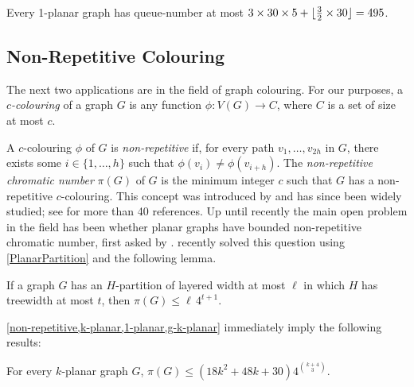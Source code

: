 \documentclass{patmorin}
\DeclarePairedDelimiter{\floor}{\lfloor}{\rfloor}
\renewcommand{\le}{\leqslant}
\begin{document}
\begin{prop}
Every 1-planar graph has queue-number at most $3 \times 30 \times 5 + \floor{\tfrac{3}{2} \times 30} = 495$. \end{prop}


\subsection{Non-Repetitive Colouring}

The next two applications are in the field of graph colouring. For our purposes, a \emph{$c$-colouring} of a graph $G$ is any function $\phi\colon V(G)\to C$, where $C$ is a set of size at most $c$.

A $c$-colouring $\phi$ of $G$ is \emph{non-repetitive} if, for every path $v_1,\ldots,v_{2h}$ in $G$, there exists some $i\in\{1,\ldots,h\}$ such that $\phi(v_i)\neq\phi(v_{i+h})$.  The \emph{non-repetitive chromatic number} $\pi(G)$ of $G$ is the minimum integer $c$ such that $G$ has a non-repetitive $c$-colouring. This concept was introduced by \citet{AGHR-RSA02} and has since been widely studied; see \citep{dujmovic.esperet.ea:planar} for more than 40 references. Up until recently the main open problem in the field has been whether planar graphs have bounded non-repetitive chromatic number, first asked by \citet{AGHR-RSA02}. \citet{dujmovic.esperet.ea:planar} recently solved this question using \cref{PlanarPartition} and the following lemma.


\begin{lem}
\label{non-repetitive}
If a graph $G$ has an $H$-partition of layered width at most $\ell$ in which $H$ has treewidth at most $t$, then $\pi(G)\le \ell\, 4^{t+1}$.
\end{lem}


\cref{non-repetitive,k-planar,1-planar,g-k-planar} immediately imply the following results:

\begin{cor}
  For every $k$-planar graph $G$, 
  $\pi(G)\le (18k^2+48k+30) 4^{\binom{k+4}{3}}$.
\end{cor}
\end{document}
